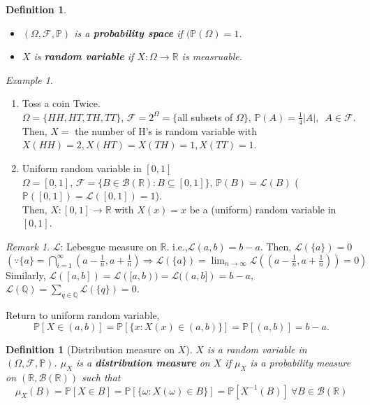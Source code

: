 \documentclass[12pt]{report}
\renewcommand{\subset}{\subseteq}
\theoremstyle{break}
\theoremstyle{newdef}
\newtheorem{defn}[thm]{Definition} %
\theoremstyle{remark}
\newtheorem*{exmp}{Example} %
\newtheorem*{rem}{Remark} %
\begin{document}
\begin{defn}
\leavevmode
\vspace{-6mm}
\begin{itemize}
\item $(\Omega, \mathcal{F}, \mathbb{P})$ is a \textbf{probability space} if $(\mathbb{P}(\Omega) = 1$.
\item $X$ is \textbf{random variable} if $X : \Omega \rightarrow \mathbb{R}$ is measruable.
\end{itemize}
\end{defn}

\begin{exmp}
\leavevmode
\begin{enumerate}
\item Toss a coin Twice.\\
$\Omega = \{HH,HT,TH,TT\}$,
$\mathcal{F} = 2^\Omega = \{$all subsets of $\Omega\}$,
$\mathbb{P}(A) = \frac{1}{4}|A|, \enspace A \in \mathcal{F}$.\\
Then, $X = $ the number of H's is random variable with $X(HH) = 2, X(HT)=X(TH)=1, X(TT)=1$.

\item Uniform random variable in $[0,1]$\\
$\Omega=  [0,1]$,
$\mathcal{F} = \{B \in \mathcal{B}(\mathbb{R}) : B \subset [0,1]\}$,
$\mathbb{P}(B) = \mathcal{L}(B)$ ($\mathbb{P}([0,1]) = \mathcal{L}([0,1]) = 1$).\\
Then, $X : [0,1] \rightarrow \mathbb{R}$ with $X(x) = x$ be a (uniform) random variable in $[0,1]$.
\end{enumerate}
\end{exmp}


\begin{rem}
$\mathcal{L}$: Lebesgue measure on $\mathbb{R}$. i.e.,$\mathcal{L}(a,b) = b-a$.
Then, $\mathcal{L}(\{a\}) = 0$\\
$(\because
\{a\} = \bigcap_{i=1}^\infty (a-\frac{1}{n}, a+\frac{1}{n})
\Rightarrow \mathcal{L}(\{a\}) = \lim_{n\rightarrow\infty} \mathcal{L}((a-\frac{1}{n}, a+\frac{1}{n})) = 0
)$\\
Similarly, $\mathcal{L}([a,b]) = \mathcal{L}([a,b)) = \mathcal{L}((a,b]) = b-a$,
$\mathcal{L}(\mathbb{Q}) = \sum_{q \in \mathbb{Q}}\mathcal{L}(\{q\}) = 0$.
\end{rem}

Return to uniform random variable,
$$\mathbb{P}[X \in (a,b)] = \mathbb{P}[\{x : X(x) \in (a,b)\}] = \mathbb{P}[(a,b)] = b-a.$$

\begin{defn}[Distribution measure on $X$]
$X$ is a random variable in $(\Omega, \mathcal{F}, \mathbb{P})$.
$\mu_X$ is a \textbf{distribution measure} on $X$ if $\mu_X$ is a probability measure on $(\mathbb{R}, \mathcal{B}(\mathbb{R}))$ such that 
$$
\mu_X(B) = \mathbb{P}[X \in B]
= \mathbb{P}[\{\omega : X(\omega) \in B\}]
= \mathbb{P}[X^{-1}(B)] \ \forall B \in \mathcal{B}(\mathbb{R})
$$
\end{defn}
\end{document}
